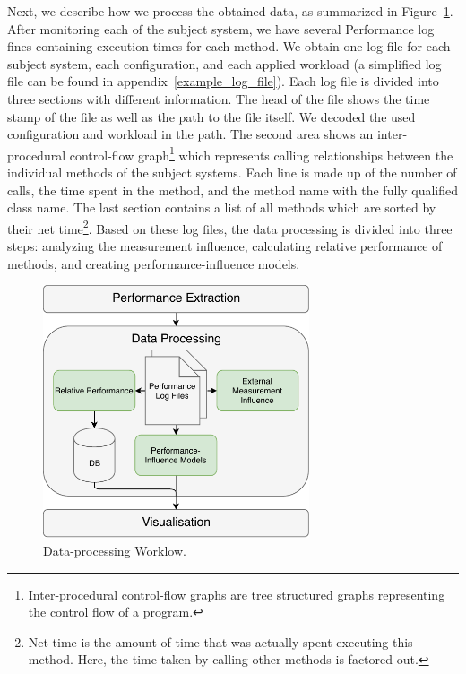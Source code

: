 Next, we describe how we process the obtained data, as summarized in Figure~\ref{data_processing_workflow}. After monitoring each of the subject system, we have several Performance log fines containing execution times for each method. We obtain one log file for each subject system, each configuration, and each applied workload (a simplified log file can be found in appendix~\ref{example_log_file}). Each log file is divided into three sections with different information. The head of the file shows the time stamp of the file as well as the path to the file itself. We decoded the used configuration and workload in the path. The second area shows an inter-procedural control-flow graph\footnote{Inter-procedural control-flow graphs are tree structured graphs representing the control flow of a program.} which represents calling relationships between the individual methods of the subject systems. Each line is made up of the number of calls, the time spent in the method, and the method name with the fully qualified class name. The last section contains a list of all methods which are sorted by their net time\footnote{Net time is the amount of time that was actually spent executing this method. Here, the time taken by calling other methods is factored out.}. Based on these log files, the data processing is divided into three steps: analyzing the measurement influence, calculating relative performance of methods, and creating performance-influence models.


\begin{figure}
  \centering
  \includegraphics[width=0.7\textwidth]{images/workflow_data_expanded}
  \caption{Data-processing Worklow.}
  \label{data_processing_workflow}
\end{figure}


